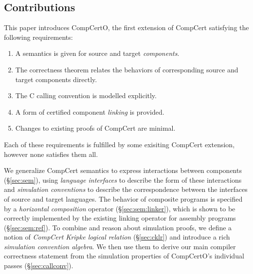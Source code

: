 \documentclass[sigplan,10pt,review]{acmart}
\begin{document}

\subsection{Contributions} \label{sec:compcertreq} %

This paper introduces CompCertO,
the first extension of CompCert
satisfying the following requirements:
\begin{enumerate}
\item \label{req:opensem}
  A semantics is given for
  source and target \emph{components}.
\item \label{req:opensim}
  The correctness theorem relates
  the behaviors of corresponding
  source and target components directly.
\item \label{req:openabs}
  The C calling convention is modelled explicitly.
\item \label{req:linking}
  A form of certified component \emph{linking}
  is provided.
\item \label{req:complexity}
  Changes to existing proofs of CompCert
  are minimal.
\end{enumerate}
Each of these requirements is fulfilled
by some exisiting CompCert extension,
however none satisfies them all.


We generalize CompCert semantics
to express interactions between components (\S\ref{sec:sem}),
using \emph{language interfaces}
to describe the form of these interactions
and \emph{simulation conventions}
to describe the correspondence between the interfaces
of source and target languages.
The behavior of
composite programs is specified by a
\emph{horizontal composition} operator (\S\ref{sec:sem:linker}),
which is shown to be correctly implemented
by the existing linking operator for assembly programs
(\S\ref{sec:sem:ref}).
To combine and reason about simulation proofs,
we define a notion of
\emph{CompCert Kripke logical relation} (\S\ref{sec:cklr})
and introduce a rich \emph{simulation convention algebra}.
We then use them to derive our main compiler correctness statement
from the simulation properties
of CompCertO's individual passes
(\S\ref{sec:callconv}).

\end{document}
